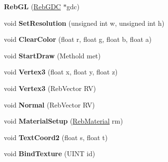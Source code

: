 \begin{DoxyCompactItemize}
\item 
{\bfseries Reb\+GL} (\hyperlink{class_reb_g_d_c}{Reb\+G\+DC} $\ast$gdc)\hypertarget{class_reb_g_l_a1299f244c431d291797af293f8cadc72}{}\label{class_reb_g_l_a1299f244c431d291797af293f8cadc72}

\item 
void {\bfseries Set\+Resolution} (unsigned int w, unsigned int h)\hypertarget{class_reb_g_l_aff84b4e00dee30286513a4bdd1d0e728}{}\label{class_reb_g_l_aff84b4e00dee30286513a4bdd1d0e728}

\item 
void {\bfseries Clear\+Color} (float r, float g, float b, float a)\hypertarget{class_reb_g_l_a88abd24ddf39cf6a88e904a262fe96aa}{}\label{class_reb_g_l_a88abd24ddf39cf6a88e904a262fe96aa}

\item 
void {\bfseries Start\+Draw} (Methold met)\hypertarget{class_reb_g_l_ac41a4e102588d6d11c1ac1cd679ab1f5}{}\label{class_reb_g_l_ac41a4e102588d6d11c1ac1cd679ab1f5}

\item 
void {\bfseries Vertex3} (float x, float y, float z)\hypertarget{class_reb_g_l_a57e7e9268558c9c9490dc8526ee38ec1}{}\label{class_reb_g_l_a57e7e9268558c9c9490dc8526ee38ec1}

\item 
void {\bfseries Vertex3} (Reb\+Vector RV)\hypertarget{class_reb_g_l_a79439bd8604df7dead9858e53a08f627}{}\label{class_reb_g_l_a79439bd8604df7dead9858e53a08f627}

\item 
void {\bfseries Normal} (Reb\+Vector RV)\hypertarget{class_reb_g_l_a97d64fb61e1a465ce0e1d85685f889f7}{}\label{class_reb_g_l_a97d64fb61e1a465ce0e1d85685f889f7}

\item 
void {\bfseries Material\+Setup} (\hyperlink{class_reb_material}{Reb\+Material} rm)\hypertarget{class_reb_g_l_a9386392d17167a9ec682dbcf18d7356d}{}\label{class_reb_g_l_a9386392d17167a9ec682dbcf18d7356d}

\item 
void {\bfseries Text\+Coord2} (float s, float t)\hypertarget{class_reb_g_l_a22796f0c3d9281456a509847fcd945f9}{}\label{class_reb_g_l_a22796f0c3d9281456a509847fcd945f9}

\item 
void {\bfseries Bind\+Texture} (U\+I\+NT id)\hypertarget{class_reb_g_l_a0fab00acb6978968603dd5f567f51917}{}\label{class_reb_g_l_a0fab00acb6978968603dd5f567f51917}


\end{DoxyCompactItemize}

